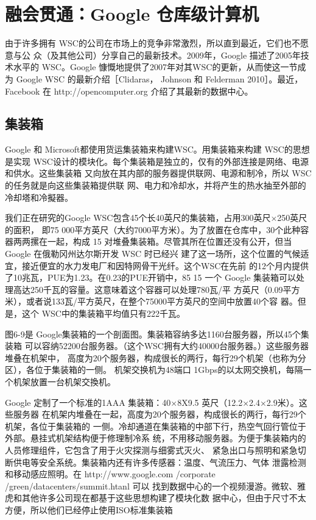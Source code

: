 \section{融会贯通：Google 仓库级计算机}
由于许多拥有 WSC的公司在市场上的竞争非常激烈，所以直到最近，它们也不愿意与公
众（及其他公司）分享自己的最新技术。2009年，Google 描述了2005年技术水平的 WSC。Google
慷慨地提供了2007年对其WSC的更新，从而使这一节成为 Google WSC 的最新介绍［Clidaras，
Johnson 和 Felderman 2010］。最近，Facebook 在 http://opencomputer.org 介绍了其最新的数据中心。

\subsection{集装箱}
Google 和 Microsoft都使用货运集装箱来构建WSC。用集装箱来构建 WSC的思想是实现
WSC设计的模块化。每个集装箱是独立的，仅有的外部连接是网络、电源和供水。这些集装箱
又向放在其内部的服务器提供联网、电源和制冷，所以 WSC的任务就是向这些集装箱提供联
网、电力和冷却水，并将产生的热水抽至外部的冷却塔和冷擬器。

我们正在研究的Google WSC包含45个长40英尺的集装箱，占用300英尺×250英尺的面积，
即75 000平方英尺（大约7000平方米）。为了放置在仓库中，30个此种容器两两摞在一起，构成
15 对堆叠集装箱。尽管其所在位置还没有公开，但当 Google 在俄勒冈州达尔斯开发 WSC 时已经兴
建了这一场所，这个位置的气候适宜，接近便宜的水力发电厂和因特网骨干光纤。这个WSC在先前
的12个月内提供了10兆瓦，PUE为1.23。在0.23的PUE开销中，85%
15%
一个 Google 集装箱可以处理高达250千瓦的容量。这意味着这个容器可以处理780瓦/平
方英尺（0.09平方米），或者说133瓦/平方英尺，在整个75000平方英尺的空间中放置40个容
器。但是，这个 WSC中的集装箱平均值只有222千瓦。

图6-9是 Google集装箱的一个剖面图。集装箱容纳多达1160台服务器，所以45个集装箱
可以容纳52200台服务器。（这个WSC拥有大约40000台服务器。）这些服务器堆叠在机架中，
高度为20个服务器，构成很长的两行，每行29个机架（也称为分区），各位于集装箱的一侧。
机架交换机为48端口 1Gbps的以太网交换机，每隔一个机架放置一台机架交換机。

Google 定制了一个标准的1AAA 集装箱：40×8X9.5 英尺（12.2×2.4×2.9米）。这些服务器
在机架内堆叠在一起，高度为20个服务器，构成很长的两行，每行29个机架，各位于集装箱的
一侧。冷却通道在集装箱的中部下行，热空气回行管位于外部。悬挂式机架结构便于修理制冷系
统，不用移动服务器。为便于集装箱内的人员修理组件，它包含了用于火灾探测与细雾式灭火、
紧急出口与照明和紧急切断供电等安全系统。集装箱内还有许多传感器：温度、气流压力、气体
泄露检测和移动感应照明。在 http://www.google.com /corporate /green/datacenters/summit.htanl 可以
找到数据中心的一个视频漫游。微软、雅虎和其他许多公司现在都基于这些思想构建了模块化数
据中心，但由于尺寸不太方便，所以他们已经停止使用ISO标准集装箱

